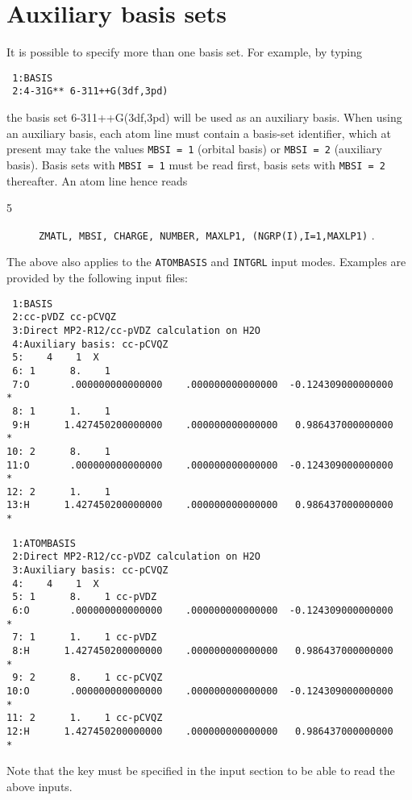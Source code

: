 \section{Auxiliary basis sets}

It is possible to specify more than one basis set. For example, by typing
\begin{verbatim}
 1:BASIS
 2:4-31G** 6-311++G(3df,3pd)
\end{verbatim}
the basis set 6-311++G(3df,3pd) will be used as an auxiliary basis.
When using an auxiliary basis, each atom line must contain a basis-set
identifier, which at present may take the values {\tt MBSI = 1} (orbital basis) or 
{\tt MBSI = 2} (auxiliary basis). Basis sets with {\tt MBSI = 1} must be read first,
basis sets with {\tt MBSI = 2} thereafter.
An atom line hence reads
\begin{description}
\item[5] \verb|ZMATL, MBSI, CHARGE, NUMBER, MAXLP1, (NGRP(I),I=1,MAXLP1)|\break
{}.
\end{description}
The above also applies to the \verb|ATOMBASIS| and \verb|INTGRL| input modes.
Examples are provided by the following input files:
\begin{verbatim}
 1:BASIS
 2:cc-pVDZ cc-pCVQZ
 3:Direct MP2-R12/cc-pVDZ calculation on H2O
 4:Auxiliary basis: cc-pCVQZ
 5:    4    1  X
 6: 1      8.    1
 7:O       .000000000000000    .000000000000000  -0.124309000000000       *
 8: 1      1.    1
 9:H      1.427450200000000    .000000000000000   0.986437000000000       *
10: 2      8.    1
11:O       .000000000000000    .000000000000000  -0.124309000000000       *
12: 2      1.    1
13:H      1.427450200000000    .000000000000000   0.986437000000000       *
\end{verbatim}
\begin{verbatim}
 1:ATOMBASIS
 2:Direct MP2-R12/cc-pVDZ calculation on H2O
 3:Auxiliary basis: cc-pCVQZ
 4:    4    1  X
 5: 1      8.    1 cc-pVDZ
 6:O       .000000000000000    .000000000000000  -0.124309000000000       *
 7: 1      1.    1 cc-pVDZ
 8:H      1.427450200000000    .000000000000000   0.986437000000000       *
 9: 2      8.    1 cc-pCVQZ
10:O       .000000000000000    .000000000000000  -0.124309000000000       *
11: 2      1.    1 cc-pCVQZ
12:H      1.427450200000000    .000000000000000   0.986437000000000       *
\end{verbatim}
Note that the key  must be specified in the 
 input section to be able to read the above inputs.

